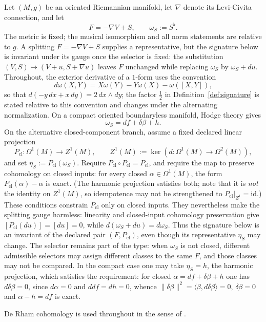 \documentclass[11pt]{article}
\theoremstyle{definition}
\begin{document}
Let \((M,g)\) be an oriented Riemannian manifold, let \(\nabla\) denote its
Levi-Civita connection, and let
\[
F=-\nabla V+S,\qquad \omega_S:=S^\flat.
\]
The metric is fixed; the musical isomorphism and all norm statements are
relative to \(g\).  A splitting \(F=-\nabla V+S\) supplies a representative,
but the signature below is invariant under its gauge once the selector is
fixed: the substitution \((V,S)\mapsto(V+u,S+\nabla u)\) leaves \(F\) unchanged
while replacing \(\omega_S\) by \(\omega_S+du\).  Throughout,
the exterior derivative of a \(1\)-form uses the convention
\[
d\omega(X,Y)=X\omega(Y)-Y\omega(X)-\omega([X,Y]),
\]
so that \(d(-y\,dx+x\,dy)=2\,dx\wedge dy\); the factor \(\tfrac12\) in
Definition~\ref{def:signature} is stated relative to this convention and
changes under the alternating normalization.  On a compact oriented
boundaryless manifold, Hodge theory \cite{warner} gives
\[
\omega_S=df+\delta\beta+h.
\]
On the alternative closed-component branch, assume a fixed declared linear
projection
\[
P_{\mathrm{cl}}:\Omega^1(M)\longrightarrow Z^1(M),\qquad
Z^1(M):=\ker\!\left(d:\Omega^1(M)\to\Omega^2(M)\right),
\]
and set \(\eta_S:=P_{\mathrm{cl}}(\omega_S)\).  Require
\(P_{\mathrm{cl}}\circ P_{\mathrm{cl}}=P_{\mathrm{cl}}\), and require the map
to preserve cohomology on closed inputs: for every closed \(\alpha\in
\Omega^1(M)\), the form \(P_{\mathrm{cl}}(\alpha)-\alpha\) is exact.  (The
harmonic projection satisfies both; note that it is \emph{not} the identity
on \(Z^1(M)\), so idempotence may not be strengthened to
\(P_{\mathrm{cl}}|_{Z^1}=\mathrm{id}\).)  These conditions constrain \(P_{\mathrm{cl}}\) only on closed inputs.  They
nevertheless make the splitting gauge harmless: linearity and closed-input
cohomology preservation give
\([P_{\mathrm{cl}}(du)]=[du]=0\), while
\(d(\omega_S+du)=d\omega_S\).  Thus the signature below is an invariant of
the declared pair \((F,P_{\mathrm{cl}})\), even though its representative
\(\eta_S\) may change.  The selector remains part of the type: when
\(\omega_S\) is not closed, different admissible selectors may assign
different classes to the same \(F\), and those classes may not be compared.
In the compact case one may take
\(\eta_S=h\), the harmonic projection, which satisfies the requirement:
for closed \(\alpha=df+\delta\beta+h\) one has \(d\delta\beta=0\), since
\(d\alpha=0\) and \(ddf=dh=0\), whence
\(\lVert\delta\beta\rVert^2=\langle\beta,d\delta\beta\rangle=0\),
\(\delta\beta=0\) and \(\alpha-h=df\) is exact.

De Rham cohomology is used throughout in the sense of \cite{bott-tu}.
\end{document}
